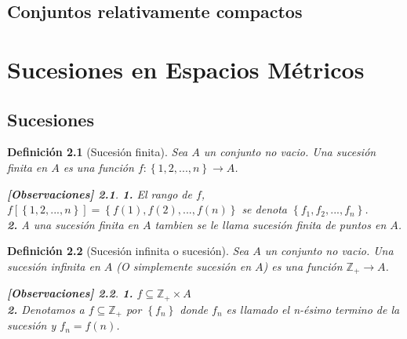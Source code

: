 \documentclass[oneside]{book} %
\theoremstyle{Teorema}
\newtheorem{Definicion}{Definición}[chapter]
\theoremstyle{Ejemplos}
\theoremstyle{[Obs]}
\newtheorem*{Obs}{[Observaciones]}
\renewcommand{\{}{\left\lbrace} %
\renewcommand{\}}{\right\rbrace} %
\renewcommand{\sc}{\subseteq} %
\begin{document}
		\section{Conjuntos relativamente compactos}

	\chapter{Sucesiones en Espacios Métricos}

		\section{Sucesiones}

			\begin{Definicion}[Sucesión finita]
				
				Sea $A$ un conjunto no vacio. Una sucesión finita en $A$ es una función $f : \{ 1, 2, ..., n \} \to A$. \\
				
				\begin{Obs}
				
					\hfill
				
					\textbf{1.} El rango de $f$, $f[\{ 1, 2, ..., n \}] = \{ f(1), f(2), ..., f(n) \}$ se denota $\{ f_1, f_2, ..., f_n \}$. \\

					\textbf{2.} A una sucesión finita en $A$ tambien se le llama sucesión finita de puntos en $A$. \\
				
				\end{Obs}

			\end{Definicion}

			\begin{Definicion}[Sucesión infinita o sucesión]
				
				Sea $A$ un conjunto no vacio. Una sucesión infinita en $A$ (O simplemente sucesión en $A$) es una función $\mathbb{Z}_{+} \to A$. \\

				\begin{Obs}
				
					\hfill
				
					\textbf{1.} $f \sc \mathbb{Z}_{+} \times A$ \\

					\textbf{2.} Denotamos a $f \sc \mathbb{Z}_{+}$ por $\{ f_n \}$ donde $f_n$ es llamado el n-ésimo termino de la sucesión y $f_n = f(n)$. \\
				
				\end{Obs}

			\end{Definicion}
\end{document}
